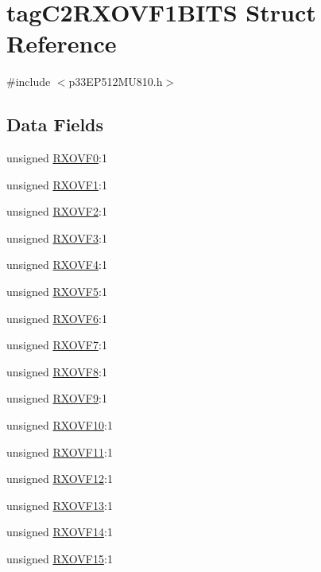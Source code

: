 \hypertarget{structtag_c2_r_x_o_v_f1_b_i_t_s}{}\section{tag\+C2\+R\+X\+O\+V\+F1\+B\+I\+TS Struct Reference}
\label{structtag_c2_r_x_o_v_f1_b_i_t_s}


{\ttfamily \#include $<$p33\+E\+P512\+M\+U810.\+h$>$}

\subsection*{Data Fields}
\begin{DoxyCompactItemize}
\item 
unsigned \hyperlink{structtag_c2_r_x_o_v_f1_b_i_t_s_ae0b847b473348ca5a45c6f38ee08bbcb}{R\+X\+O\+V\+F0}\+:1
\item 
unsigned \hyperlink{structtag_c2_r_x_o_v_f1_b_i_t_s_a891cc3298219da79ad3587b2af0ce757}{R\+X\+O\+V\+F1}\+:1
\item 
unsigned \hyperlink{structtag_c2_r_x_o_v_f1_b_i_t_s_a191326a306fedb6166b6cdc603942680}{R\+X\+O\+V\+F2}\+:1
\item 
unsigned \hyperlink{structtag_c2_r_x_o_v_f1_b_i_t_s_a1eec8dfb9c616fce24f842eb366bc147}{R\+X\+O\+V\+F3}\+:1
\item 
unsigned \hyperlink{structtag_c2_r_x_o_v_f1_b_i_t_s_a2831c78a3982628ca3784c2dca25df43}{R\+X\+O\+V\+F4}\+:1
\item 
unsigned \hyperlink{structtag_c2_r_x_o_v_f1_b_i_t_s_aed0050151e4d5c22e7028b5c12444c8a}{R\+X\+O\+V\+F5}\+:1
\item 
unsigned \hyperlink{structtag_c2_r_x_o_v_f1_b_i_t_s_a6ccb1f1e3c9cd54c2969afb6930a4ac8}{R\+X\+O\+V\+F6}\+:1
\item 
unsigned \hyperlink{structtag_c2_r_x_o_v_f1_b_i_t_s_ace6e36de91b24cb700bb1fb616d086d2}{R\+X\+O\+V\+F7}\+:1
\item 
unsigned \hyperlink{structtag_c2_r_x_o_v_f1_b_i_t_s_ab78d6bee18c7d77bd9601b3f116feea1}{R\+X\+O\+V\+F8}\+:1
\item 
unsigned \hyperlink{structtag_c2_r_x_o_v_f1_b_i_t_s_ac0b74dc5dacfef7f34c87bb86fa929c7}{R\+X\+O\+V\+F9}\+:1
\item 
unsigned \hyperlink{structtag_c2_r_x_o_v_f1_b_i_t_s_a568cb5840eae29ceca9f906f6bd741ef}{R\+X\+O\+V\+F10}\+:1
\item 
unsigned \hyperlink{structtag_c2_r_x_o_v_f1_b_i_t_s_ae3e8de9267944311f2525a9edac345b2}{R\+X\+O\+V\+F11}\+:1
\item 
unsigned \hyperlink{structtag_c2_r_x_o_v_f1_b_i_t_s_a5b6bf6e42753bf68fd9cdbdb96dc1c6f}{R\+X\+O\+V\+F12}\+:1
\item 
unsigned \hyperlink{structtag_c2_r_x_o_v_f1_b_i_t_s_a42ec9c691bf2923c7dd57bf3fbf772ad}{R\+X\+O\+V\+F13}\+:1
\item 
unsigned \hyperlink{structtag_c2_r_x_o_v_f1_b_i_t_s_a39257bd069636400b0b19f3872108ead}{R\+X\+O\+V\+F14}\+:1
\item 
unsigned \hyperlink{structtag_c2_r_x_o_v_f1_b_i_t_s_a972dd27e236e814b9892f013bdbf4f49}{R\+X\+O\+V\+F15}\+:1
\end{DoxyCompactItemize}


